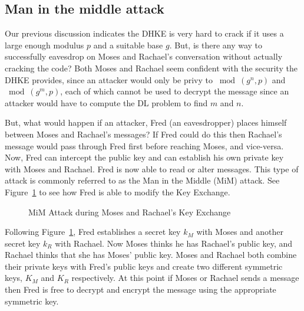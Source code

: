 \subsection{Man in the middle attack}
Our previous discussion indicates the DHKE is very hard to crack if it uses a large enough modulus $p$ and a suitable base $g$. But, is there any way to successfully eavesdrop on Moses and Rachael's conversation without actually cracking the code?  Both Moses and Rachael seem confident with the security the DHKE provides, since an attacker would only be privy to $\bmod (g^n , p)$ and $\bmod (g^m , p)$, each of which cannot be used to decrypt the message since an attacker would have to compute the DL problem to find $m$ and $n$. 

But, what would happen if an attacker, Fred (an eavesdropper) places himself between Moses and Rachael's messages?  If Fred could do this then Rachael's message would pass through Fred first before reaching Moses, and vice-versa. Now, Fred can intercept the public key and can establish his own private key with Moses and Rachael.  Fred is now able to read or alter messages.  This type of attack is commonly referred to as the Man in the Middle (MiM) attack.  See Figure~\ref{fig:DH:DHKE_2} to see how Fred is able to modify the Key Exchange.
\begin{figure}[H]
	  \caption{\label{fig:DH:DHKE_2} MiM Attack during Moses and Rachael's Key Exchange }
\end{figure}

Following Figure~\ref{fig:DH:DHKE_2}, Fred establishes a secret key $k_M$ with Moses and another secret key $k_R$ with Rachael.  Now Moses thinks he has Rachael's public key, and Rachael thinks that she has Moses' public key. Moses and Rachael both combine their private keys with Fred's public keys and create two different symmetric keys, $K_M$ and $K_R$ respectively. At this point if Moses or Rachael sends a message then Fred is free to decrypt and encrypt the message using the appropriate symmetric key. 

